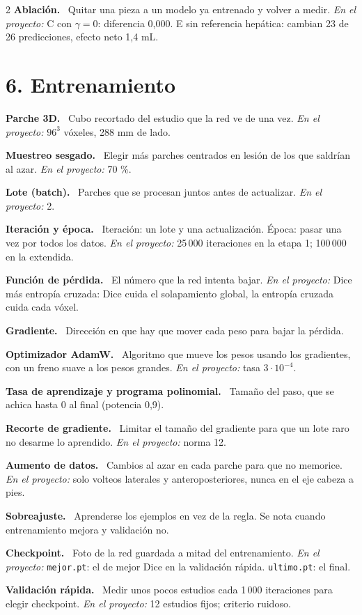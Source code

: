 \documentclass[9pt,a4paper]{extarticle}
\newcommand{\T}[1]{{\sffamily\bfseries\color{tinta}#1.}\ }
\newcommand{\aqui}[1]{{\color{acento}\itshape En el proyecto:} #1}
\begin{document}
\begin{multicols}{2}
\T{Ablación} Quitar una pieza a un modelo ya entrenado y volver a medir. \aqui{C con $\gamma = 0$: diferencia 0,000. E sin referencia hepática: cambian 23 de 26 predicciones, efecto neto 1,4 mL.}

\section{6. Entrenamiento}

\T{Parche 3D} Cubo recortado del estudio que la red ve de una vez. \aqui{$96^3$ vóxeles, 288 mm de lado.}

\T{Muestreo sesgado} Elegir más parches centrados en lesión de los que saldrían al azar. \aqui{70 \%.}

\T{Lote (batch)} Parches que se procesan juntos antes de actualizar. \aqui{2.}

\T{Iteración y época} Iteración: un lote y una actualización. Época: pasar una vez por todos los datos. \aqui{25\,000 iteraciones en la etapa 1; 100\,000 en la extendida.}

\T{Función de pérdida} El número que la red intenta bajar. \aqui{Dice más entropía cruzada: Dice cuida el solapamiento global, la entropía cruzada cuida cada vóxel.}

\T{Gradiente} Dirección en que hay que mover cada peso para bajar la pérdida.

\T{Optimizador AdamW} Algoritmo que mueve los pesos usando los gradientes, con un freno suave a los pesos grandes. \aqui{tasa $3\cdot10^{-4}$.}

\T{Tasa de aprendizaje y programa polinomial} Tamaño del paso, que se achica hasta 0 al final (potencia 0,9).

\T{Recorte de gradiente} Limitar el tamaño del gradiente para que un lote raro no desarme lo aprendido. \aqui{norma 12.}

\T{Aumento de datos} Cambios al azar en cada parche para que no memorice. \aqui{solo volteos laterales y anteroposteriores, nunca en el eje cabeza a pies.}

\T{Sobreajuste} Aprenderse los ejemplos en vez de la regla. Se nota cuando entrenamiento mejora y validación no.

\T{Checkpoint} Foto de la red guardada a mitad del entrenamiento. \aqui{\texttt{mejor.pt}: el de mejor Dice en la validación rápida. \texttt{ultimo.pt}: el final.}

\T{Validación rápida} Medir unos pocos estudios cada 1\,000 iteraciones para elegir checkpoint. \aqui{12 estudios fijos; criterio ruidoso.}


\end{multicols}
\end{document}
